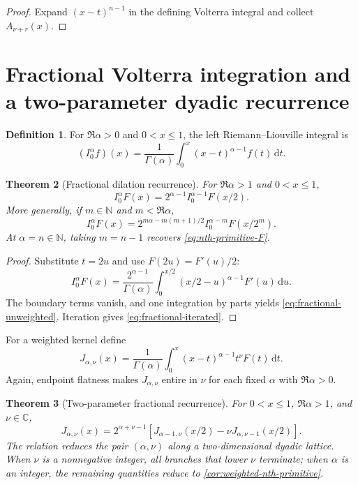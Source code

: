 \documentclass[11pt,oneside]{article}
\newtheorem{theorem}{Theorem}[section]
\theoremstyle{definition}
\newtheorem{definition}[theorem]{Definition}
\theoremstyle{remark}
\newcommand{\C}{\mathbb C}
\newcommand{\N}{\mathbb N}
\newcommand{\dd}{\,\mathrm d}
\begin{document}
\begin{proof}
Expand $(x-t)^{n-1}$ in the defining Volterra integral and collect $A_{\nu+r}(x)$.
\end{proof}

\section{Fractional Volterra integration and a two-parameter dyadic recurrence}

\begin{definition}
For $\Re\alpha>0$ and $0<x\le1$, the left Riemann--Liouville integral is
\begin{equation}
 (I_0^\alpha f)(x)=\frac1{\Gamma(\alpha)}
 \int_0^x(x-t)^{\alpha-1}f(t)\dd t.
\end{equation}
\end{definition}

\begin{theorem}[Fractional dilation recurrence]\label{thm:fractional-unweighted}
For $\Re\alpha>1$ and $0<x\le1$,
\begin{equation}\label{eq:fractional-unweighted}
 I_0^\alpha F(x)=2^{\alpha-1}I_0^{\alpha-1}F(x/2).
\end{equation}
More generally, if $m\in\N$ and $m<\Re\alpha$,
\begin{equation}\label{eq:fractional-iterated}
 I_0^\alpha F(x)=
 2^{m\alpha-m(m+1)/2}I_0^{\alpha-m}F(x/2^m).
\end{equation}
At $\alpha=n\in\N$, taking $m=n-1$ recovers \eqref{eq:nth-primitive-F}.
\end{theorem}

\begin{proof}
Substitute $t=2u$ and use $F(2u)=F'(u)/2$:
\[
 I_0^\alpha F(x)=\frac{2^{\alpha-1}}{\Gamma(\alpha)}
 \int_0^{x/2}(x/2-u)^{\alpha-1}F'(u)\dd u.
\]
The boundary terms vanish, and one integration by parts yields \eqref{eq:fractional-unweighted}.  Iteration gives \eqref{eq:fractional-iterated}.
\end{proof}

For a weighted kernel define
\begin{equation}\label{eq:J-alpha-nu}
 J_{\alpha,\nu}(x)=
 \frac1{\Gamma(\alpha)}\int_0^x
 (x-t)^{\alpha-1}t^\nu F(t)\dd t.
\end{equation}
Again, endpoint flatness makes $J_{\alpha,\nu}$ entire in $\nu$ for each fixed $\alpha$ with $\Re\alpha>0$.

\begin{theorem}[Two-parameter fractional recurrence]\label{thm:fractional-weighted}
For $0<x\le1$, $\Re\alpha>1$, and $\nu\in\C$,
\begin{equation}\label{eq:fractional-weighted}
\boxed{
 J_{\alpha,\nu}(x)=2^{\alpha+\nu-1}
 \left[J_{\alpha-1,\nu}(x/2)
       -\nu J_{\alpha,\nu-1}(x/2)\right].}
\end{equation}
The relation reduces the pair $(\alpha,\nu)$ along a two-dimensional dyadic lattice.  When $\nu$ is a nonnegative integer, all branches that lower $\nu$ terminate; when $\alpha$ is an integer, the remaining quantities reduce to \cref{cor:weighted-nth-primitive}.
\end{theorem}
\end{document}
